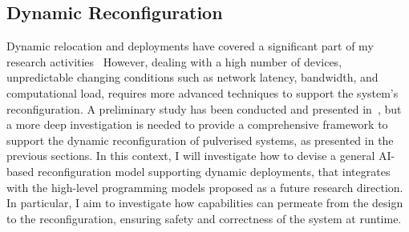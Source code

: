 \documentclass[runningheads]{llncs}
\begin{document}
\subsection{Dynamic Reconfiguration}
Dynamic relocation and deployments have covered a significant part of my research activities~\cite{DBLP:journals/fgcs/FarabegoliPCV24,DBLP:journals/iot/FarabegoliPCV24}
%
However,
dealing with a high number of devices,
unpredictable changing conditions such as network latency,
bandwidth,
and computational load,
requires more advanced techniques to support the system's reconfiguration.
%
A preliminary study has been conducted and presented in~\cite{DBLP:conf/woa/DominiFAV24},
but a more deep investigation is needed to provide a comprehensive framework to support the dynamic reconfiguration of pulverised systems,
as presented in the previous sections.
%
In this context,
I will investigate how to devise a general AI-based reconfiguration model supporting dynamic deployments,
that integrates with the high-level programming models proposed as a future research direction.
%
In particular,
I aim to investigate how capabilities can permeate from the design to the reconfiguration,
ensuring safety and correctness of the system at runtime.



%
%
%
% 
% 
\printbibliography
\end{document}
